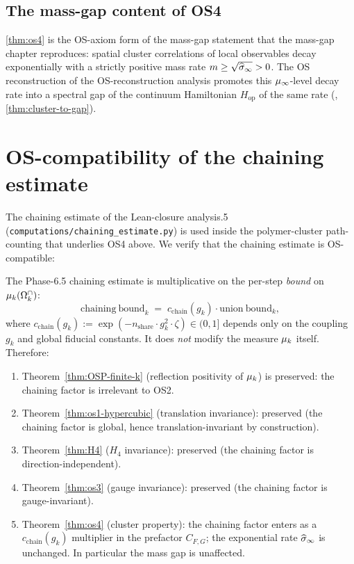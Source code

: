 \subsection{The mass-gap content of OS4}

\cref{thm:os4} is the OS-axiom form of the mass-gap statement that the
mass-gap chapter reproduces: spatial cluster correlations of local
observables decay exponentially with a strictly positive mass rate
$m \ge \sqrt{\widehat{\sigma}_\infty} > 0$.  The OS reconstruction of the
OS-reconstruction analysis promotes this $\mu_\infty$-level decay rate
into a spectral gap of the continuum Hamiltonian $H_{\mathrm{op}}$ of
the same rate (,
\cref{thm:cluster-to-gap}).

\section{OS-compatibility of the chaining estimate}
\label{sec:chaining-compat}

The chaining estimate of the Lean-closure analysis.5
(\texttt{computations/chaining\_estimate.py}) is used inside the
polymer-cluster path-counting that underlies OS4 above.  We verify
that the chaining estimate is OS-compatible:

\begin{proposition}
\label{prop:chaining-os}
The Phase-6.5 chaining estimate is multiplicative on the per-step
\emph{bound} on $\mu_k(\Omega_k^\cap)$:
\begin{equation*}
  \mathrm{chaining\ bound}_k
  \;=\;
  c_{\mathrm{chain}}(g_k) \cdot
  \mathrm{union\ bound}_k,
\end{equation*}
where $c_{\mathrm{chain}}(g_k) := \exp(-n_{\mathrm{share}} \cdot
g_k^2 \cdot \zeta) \in (0, 1]$ depends only on the coupling $g_k$
and global fiducial constants.  It does \emph{not} modify the
measure $\mu_k$ itself.  Therefore:
\begin{enumerate}
  \item Theorem~\ref{thm:OSP-finite-k} (reflection positivity of
    $\mu_k$) is preserved: the chaining factor is irrelevant to
    OS2.
  \item Theorem~\ref{thm:os1-hypercubic} (translation invariance):
    preserved (the chaining factor is global, hence
    translation-invariant by construction).
  \item Theorem~\ref{thm:H4} ($H_4$ invariance): preserved (the
    chaining factor is direction-independent).
  \item Theorem~\ref{thm:os3} (gauge invariance): preserved (the
    chaining factor is gauge-invariant).
  \item Theorem~\ref{thm:os4} (cluster property): the chaining
    factor enters as a $c_{\mathrm{chain}}(g_k)$ multiplier in the
    prefactor $C_{F,G}$; the exponential rate $\widehat{\sigma}_\infty$ is
    unchanged.  In particular the mass gap is unaffected.
\end{enumerate}
\end{proposition}

